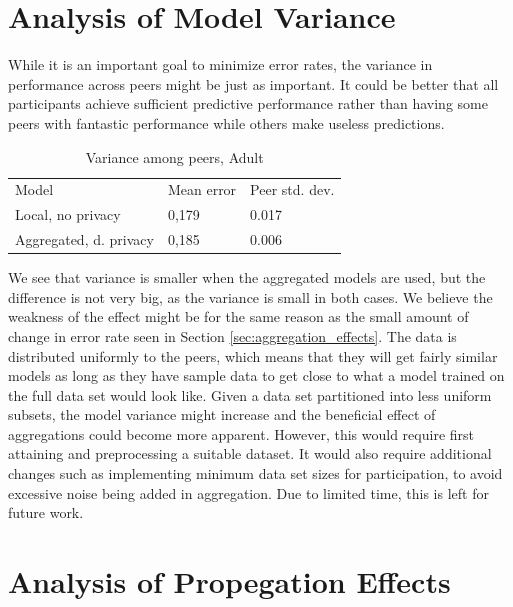 \section{Analysis of Model Variance}

While it is an important goal to minimize error rates, the variance in performance across peers might be just as important. It could be better that all participants achieve sufficient predictive performance rather than having some peers with fantastic performance while others make useless predictions.

\begin{table}[h]
	\centering
	\caption{Variance among peers, Adult}
	\label{table:peer_variance_adult}
	\begin{tabular}{lll}
		Model                  & Mean error & Peer std. dev. \\
		Local, no privacy      & 0,179       & 0.017          \\
		Aggregated, d. privacy & 0,185       & 0.006          \\       
	\end{tabular}
\end{table}        

We see that variance is smaller when the aggregated models are used, but the difference is not very big, as the variance is small in both cases. We believe the weakness of the effect might be for the same reason as the small amount of change in error rate seen in Section \ref{sec:aggregation_effects}. The data is distributed uniformly to the peers, which means that they will get fairly similar models as long as they have sample data to get close to what a model trained on the full data set would look like. Given a data set partitioned into less uniform subsets, the model variance might increase and the beneficial effect of aggregations could become more apparent. However, this would require first attaining and preprocessing a suitable dataset. It would also require additional changes such as implementing minimum data set sizes for participation, to avoid excessive noise being added in aggregation. Due to limited time, this is left for future work.


\section{Analysis of Propegation Effects}


